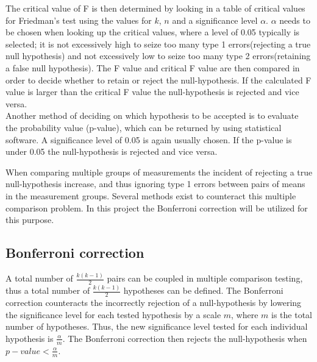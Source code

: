 The critical value of F is then determined by looking in a table of critical values for Friedman's test using the values for $k$, $n$ and a significance level $\alpha$. $\alpha$ needs to be chosen when looking up the critical values, where a level of 0.05 typically is selected; it is not excessively high to seize too many type 1 errors(rejecting a true null hypothesis) and not excessively low to seize too many type 2 errors(retaining a false null hypothesis). The F value and critical F value are then compared in order to decide whether to retain or reject the null-hypothesis. If the calculated F value is larger than the critical F value the null-hypothesis is rejected and vice versa. \cite{Zar2009} \\
Another method of deciding on which hypothesis to be accepted is to evaluate the probability value (p-value), which can be returned by using statistical software. A significance level of 0.05 is again usually chosen. If the p-value is under 0.05 the null-hypothesis is rejected and vice versa. \cite{Zar2009}

When comparing multiple groups of measurements the incident of rejecting a true null-hypothesis increase, and thus ignoring type 1 errors between pairs of means in the measurement groups.  Several methods exist to counteract this multiple comparison problem. In this project the Bonferroni correction will be utilized for this purpose.

\subsection{Bonferroni correction}
A total number of $\frac{k(k-1)}{2}$ pairs can be coupled in multiple comparison testing, thus a total number of $\frac{k(k-1)}{2}$ hypotheses can be defined. The Bonferroni correction counteracts the incorrectly rejection of a null-hypothesis by lowering the significance level for each tested hypothesis by a scale $m$, where $m$ is the total number of hypotheses. Thus, the new significance level tested for each individual hypothesis is $\frac{\alpha}{m}$. The Bonferroni correction then rejects the null-hypothesis when $p-value < \frac{\alpha}{m}$. 



